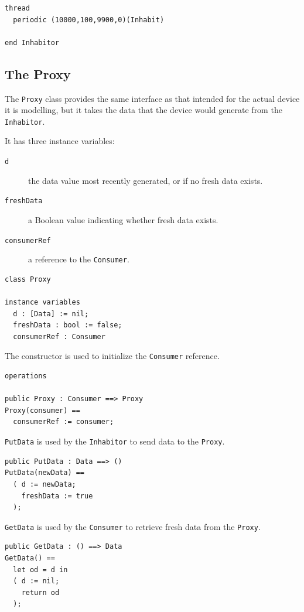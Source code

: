 \documentclass{overturerepchap}
\begin{document}
\begin{lstlisting}
thread
  periodic (10000,100,9900,0)(Inhabit)

end Inhabitor
\end{lstlisting}

\subsection{The Proxy}

The \texttt{Proxy} class provides the same interface as that intended
for the actual device it is modelling, but it takes the data that the
device would generate from the \texttt{Inhabitor}.

It has three instance variables:

\begin{description}
\item[\texttt{d}] the data value most recently generated, or {\bf{}} if no
fresh data exists.
\item[\texttt{freshData}] a Boolean value indicating whether fresh data exists.
\item[\texttt{consumerRef}] a reference to the \texttt{Consumer}.
\end{description}

\begin{lstlisting}
class Proxy

instance variables
  d : [Data] := nil;
  freshData : bool := false;
  consumerRef : Consumer
\end{lstlisting}

The constructor is used to initialize the \texttt{Consumer} reference.

\begin{lstlisting}
operations

public Proxy : Consumer ==> Proxy
Proxy(consumer) ==
  consumerRef := consumer;
\end{lstlisting}

\texttt{PutData} is used by the \texttt{Inhabitor} to send data to the
\texttt{Proxy}.

\begin{lstlisting}
public PutData : Data ==> ()
PutData(newData) ==
  ( d := newData;
    freshData := true
  );
\end{lstlisting}

\texttt{GetData} is used by the \texttt{Consumer} to retrieve fresh
data from the \texttt{Proxy}.

\begin{lstlisting}
public GetData : () ==> Data
GetData() ==
  let od = d in
  ( d := nil;
    return od
  );
\end{lstlisting}
\end{document}
